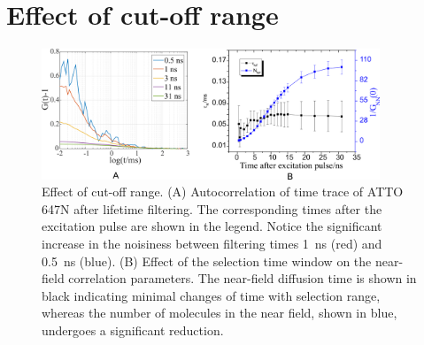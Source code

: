\documentclass[11pt,a4paper,onecolumn]{article}
\begin{document}
\section{Effect of cut-off range}
\begin{figure}[ht]
  \centering
  \includegraphics[width=0.9\textwidth]{cutoff_effect.png}
  \makeatletter
  \renewcommand{\fnum@figure}{\figurename~S\thefigure}
  \makeatother{}
  \caption{Effect of cut-off range. (A) Autocorrelation of time trace of ATTO 647N after lifetime filtering.
  The corresponding times after the excitation pulse are shown in the legend.
  Notice the significant increase in the noisiness between filtering times \SI{1}{\ns} (red) and \SI{0.5}{\ns} (blue).
  (B) Effect of the selection time window on the near-field correlation parameters.
  The near-field diffusion time is shown in black indicating minimal changes of time with selection range, whereas the number of molecules in the near field, shown in blue, undergoes a significant reduction.}
  \label{SIfig:cutoff-effect}
\end{figure}
\end{document}
